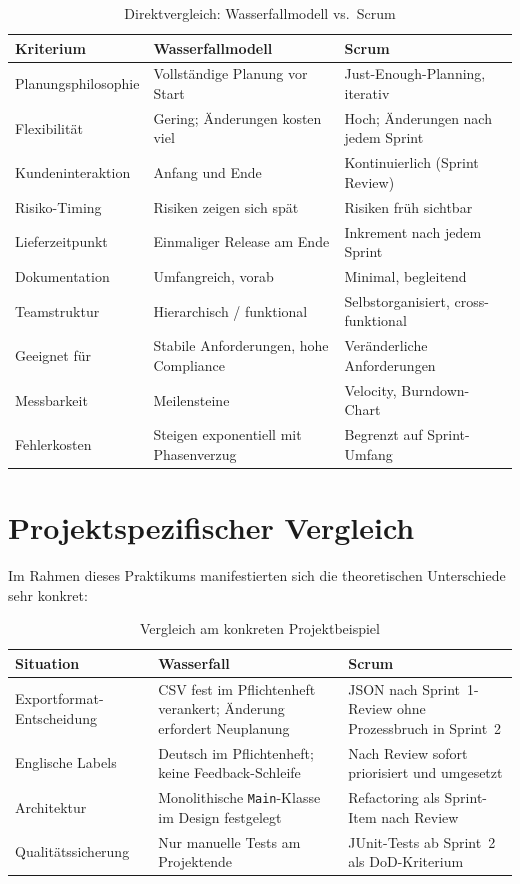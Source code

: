 \documentclass[12pt, a4paper, twoside]{report}
\begin{document}
\begin{table}[H]
  \centering
  \caption{Direktvergleich: Wasserfallmodell vs.\ Scrum}
  \label{tab:vergleich}
  \begin{tabularx}{\textwidth}{L{3.5cm} L{5cm} L{5cm}}
    \toprule
    \textbf{Kriterium} & \textbf{Wasserfallmodell} & \textbf{Scrum} \\
    \midrule
    Planungsphilosophie & Vollständige Planung vor Start & Just-Enough-Planning, iterativ \\
    Flexibilität & Gering; Änderungen kosten viel & Hoch; Änderungen nach jedem Sprint \\
    Kundeninteraktion & Anfang und Ende & Kontinuierlich (Sprint Review) \\
    Risiko-Timing & Risiken zeigen sich spät & Risiken früh sichtbar \\
    Lieferzeitpunkt & Einmaliger Release am Ende & Inkrement nach jedem Sprint \\
    Dokumentation & Umfangreich, vorab & Minimal, begleitend \\
    Teamstruktur & Hierarchisch / funktional & Selbstorganisiert, cross-funktional \\
    Geeignet für & Stabile Anforderungen, hohe Compliance & Veränderliche Anforderungen \\
    Messbarkeit & Meilensteine & Velocity, Burndown-Chart \\
    Fehlerkosten & Steigen exponentiell mit Phasenverzug & Begrenzt auf Sprint-Umfang \\
    \bottomrule
  \end{tabularx}
\end{table}

\section{Projektspezifischer Vergleich}

Im Rahmen dieses Praktikums manifestierten sich die theoretischen Unterschiede sehr konkret:

\begin{table}[H]
  \centering
  \caption{Vergleich am konkreten Projektbeispiel}
  \label{tab:projektvergleich}
  \begin{tabularx}{\textwidth}{L{3.5cm} L{5cm} L{5cm}}
    \toprule
    \textbf{Situation} & \textbf{Wasserfall} & \textbf{Scrum} \\
    \midrule
    Exportformat-Entscheidung &
      CSV fest im Pflichtenheft verankert; Änderung erfordert Neuplanung &
      JSON nach Sprint~1-Review ohne Prozessbruch in Sprint~2 \\
    Englische Labels &
      Deutsch im Pflichtenheft; keine Feedback-Schleife &
      Nach Review sofort priorisiert und umgesetzt \\
    Architektur &
      Monolithische \texttt{Main}-Klasse im Design festgelegt &
      Refactoring als Sprint-Item nach Review \\
    Qualitätssicherung &
      Nur manuelle Tests am Projektende &
      JUnit-Tests ab Sprint~2 als DoD-Kriterium \\
    \bottomrule
  \end{tabularx}
\end{table}
\end{document}
